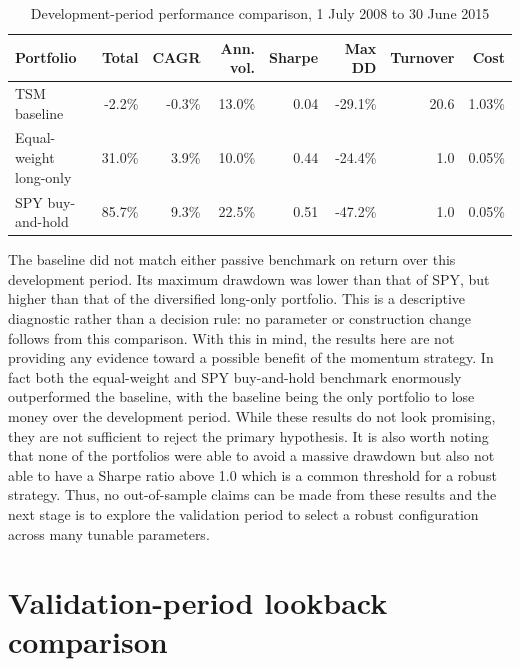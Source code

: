 \documentclass[11pt,a4paper]{article}
\begin{document}
\begin{table}[htbp]
\centering
\caption{Development-period performance comparison, 1 July 2008 to 30 June 2015}
\label{tab:train-comparison}
\small
\begin{tabular}{@{}lrrrrrrr@{}}
\toprule
\rowcolor{ReportMist}
\textbf{Portfolio} & \textbf{Total} & \textbf{CAGR} & \textbf{Ann. vol.} & \textbf{Sharpe} & \textbf{Max DD} & \textbf{Turnover} & \textbf{Cost} \\
\midrule
TSM baseline & -2.2\% & -0.3\% & 13.0\% & 0.04 & -29.1\% & 20.6 & 1.03\% \\
Equal-weight long-only & 31.0\% & 3.9\% & 10.0\% & 0.44 & -24.4\% & 1.0 & 0.05\% \\
SPY buy-and-hold & 85.7\% & 9.3\% & 22.5\% & 0.51 & -47.2\% & 1.0 & 0.05\% \\
\bottomrule
\end{tabular}
\end{table}

The baseline did not match either passive benchmark on return over this development 
period. Its maximum drawdown was lower than that of SPY, but higher than that 
of the diversified long-only portfolio. This is a descriptive diagnostic rather 
than a decision rule: no parameter or construction change follows from this 
comparison. With this in mind, the results here are not providing any 
evidence toward a possible benefit of the momentum strategy. In fact both the equal-weight
and SPY buy-and-hold benchmark enormously outperformed the baseline, with the baseline
being the only portfolio to lose money over the development period. While these 
results do not look promising, they are not sufficient to reject the primary hypothesis. 
It is also worth noting that none of the portfolios were able to avoid a massive drawdown 
but also not able to have a Sharpe ratio above 1.0 which is a common threshold for a 
robust strategy. Thus, no out-of-sample
claims can be made from these results and the next stage is to explore the validation
period to select a robust configuration across many tunable parameters. 

\FloatBarrier

\section{Validation-period lookback comparison}
\end{document}
